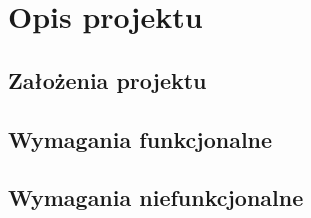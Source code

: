 \clearpage
\chapter{Opis projektu}
\section{Założenia projektu}
\section{Wymagania funkcjonalne}
\section{Wymagania niefunkcjonalne}